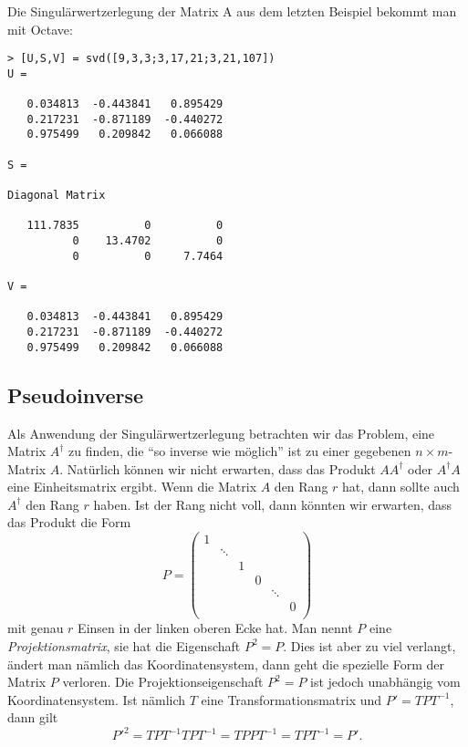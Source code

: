\begin{beispiel}
Die Singulärwertzerlegung der Matrix A aus dem letzten Beispiel 
bekommt man mit Octave:
\begin{verbatim}
> [U,S,V] = svd([9,3,3;3,17,21;3,21,107])
U =

   0.034813  -0.443841   0.895429
   0.217231  -0.871189  -0.440272
   0.975499   0.209842   0.066088

S =

Diagonal Matrix

   111.7835          0          0
          0    13.4702          0
          0          0     7.7464

V =

   0.034813  -0.443841   0.895429
   0.217231  -0.871189  -0.440272
   0.975499   0.209842   0.066088
\end{verbatim}
\end{beispiel}
\subsection{Pseudoinverse}
Als Anwendung der Singulärwertzerlegung betrachten wir das Problem, eine Matrix
$A^\dagger$
zu finden, die ``so inverse wie möglich'' ist zu einer gegebenen
$n\times m$-Matrix $A$.
Natürlich können wir nicht erwarten, dass das Produkt $AA^\dagger$ 
oder $A^\dagger A$
eine Einheitsmatrix ergibt.
Wenn die Matrix $A$ den Rang $r$ hat, dann sollte auch $A^\dagger$ den Rang $r$
haben.
Ist der Rang nicht voll, dann könnten wir erwarten, dass das Produkt die Form
\[
P=
\begin{pmatrix}
1&      & & &      & \\
 &\ddots& & &      & \\
 &      &1& &      & \\
 &      & &0&      & \\
 &      & & &\ddots& \\
 &      & & &      &0\\
\end{pmatrix}
\]
mit genau $r$ Einsen in der linken oberen Ecke hat.
Man nennt $P$ eine {\em Projektionsmatrix}, sie hat die Eigenschaft $P^2=P$.
Dies ist aber zu viel verlangt, ändert man nämlich das Koordinatensystem,
dann geht die spezielle Form der Matrix $P$ verloren.
Die Projektionseigenschaft $P^2=P$ ist jedoch unabhängig vom Koordinatensystem.
Ist nämlich $T$ eine Transformationsmatrix und $P'=TPT^{-1}$, dann gilt
\[
P'^2=TPT^{-1}TPT^{-1}=TPPT^{-1}=TPT^{-1}=P'.
\]

